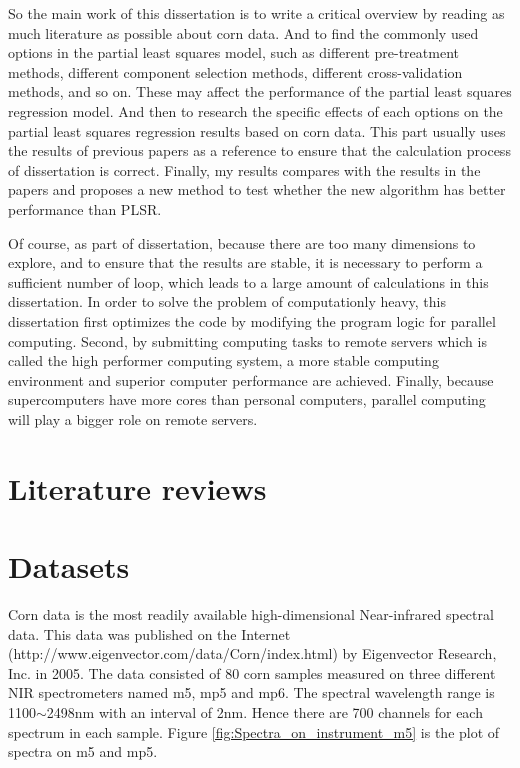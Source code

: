 \documentclass[a4paper,12pt,titlepage]{article} %
\numberwithin{equation}{section}  %
\begin{document}
	So the main work of this dissertation is to write a critical overview by reading as much literature as possible about corn data. And to find the commonly used options in the partial least squares model, such as different pre-treatment methods, different component selection methods, different cross-validation methods, and so on. These may affect the performance of the partial least squares regression model.
	And then to research the specific effects of each options on the partial least squares regression results based on corn data. This part usually uses the results of previous papers as a reference to ensure that the calculation process of dissertation is correct. 
	Finally, my results compares with the results in the papers and proposes a new method to test whether the new algorithm has better performance than PLSR. 
	
	Of course, as part of dissertation, because there are too many dimensions to explore, and to ensure that the results are stable, it is necessary to perform a sufficient number of loop, which leads to a large amount of calculations in this dissertation. In order to solve the problem of computationly heavy, this dissertation first optimizes the code by modifying the program logic for parallel computing. Second, by submitting computing tasks to remote servers which is called the high performer computing system, a more stable computing environment and superior computer performance are achieved. Finally, because supercomputers have more cores than personal computers, parallel computing will play a bigger role on remote servers.
	
	\section{Literature reviews}
	\label{sec:liter}
	
	\section{Datasets}
	\label{sec:data}
	
	Corn data is the most readily available high-dimensional Near-infrared spectral data. This data was published on the Internet (http://www.eigenvector.com/data/Corn/index.html) by Eigenvector Research, Inc. in 2005. The data consisted of 80 corn samples measured on three different NIR spectrometers named m5, mp5 and mp6. The spectral wavelength range is 1100$\sim$2498nm with an interval of 2nm. Hence there are 700 channels for each spectrum in each sample. Figure \ref{fig:Spectra_on_instrument_m5} is the plot of spectra on m5 and mp5.
	
\end{document}
